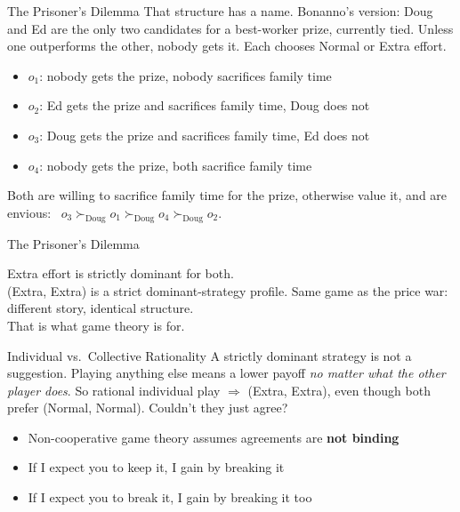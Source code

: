 \begin{frame}{The Prisoner's Dilemma}
That structure has a name. Bonanno's version:
\bsk
Doug and Ed are the only two candidates for a best-worker prize, currently tied.
Unless one outperforms the other, nobody gets it. Each chooses Normal or Extra effort.
\bsk
\begin{itemize}
    \item $o_1$: nobody gets the prize, nobody sacrifices family time
    \item $o_2$: Ed gets the prize and sacrifices family time, Doug does not
    \item $o_3$: Doug gets the prize and sacrifices family time, Ed does not
    \item $o_4$: nobody gets the prize, both sacrifice family time
\end{itemize}
\bsk
Both are willing to sacrifice family time for the prize, otherwise value it, and are
envious: \ $o_3\succ_{\text{Doug}} o_1\succ_{\text{Doug}} o_4\succ_{\text{Doug}} o_2$.
\vspace{-0.3in}
\end{frame}

\begin{frame}{The Prisoner's Dilemma}
\centering
\begin{matrixgame}[top={Normal, Extra}, left={Normal, Extra}, player names={Doug, Ed}, br]
\end{matrixgame}
\bsk
\raggedright
Extra effort is strictly dominant for both. \\
(Extra, Extra) is a strict dominant-strategy profile.
\vfill
Same game as the price war: different story, identical structure.\\
That is what game theory is for.
\vspace{-0.4in}
\end{frame}

\begin{frame}{Individual vs.\ Collective Rationality}
A strictly dominant strategy is not a suggestion. Playing anything else means a
lower payoff \textit{no matter what the other player does}.
\bsk
So rational individual play $\Rightarrow$ (Extra, Extra), even though both prefer (Normal, Normal).
\vfill
Couldn't they just agree?
\begin{itemize}
    \item Non-cooperative game theory assumes agreements are \textbf{not binding}
    \item If I expect you to keep it, I gain by breaking it \vspace{0.3in}
    \item If I expect you to break it, I gain by breaking it too \vspace{0.3in}
\end{itemize}
\end{frame}


